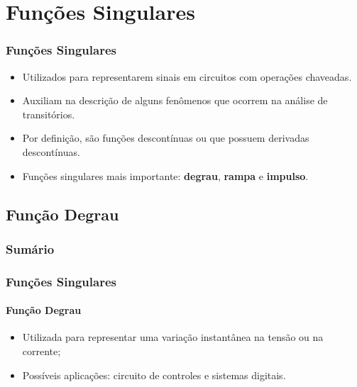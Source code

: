 \documentclass[mathserif]{beamer}
\begin{document}
\section{Funções Singulares}
\begin{frame}
\frametitle{Funções Singulares}
\begin{itemize}
	\item Utilizados para representarem sinais em circuitos com operações chaveadas.
	\item Auxiliam na descrição de alguns fenômenos que ocorrem na análise de transitórios.
	\item Por definição, são funções descontínuas ou que possuem derivadas descontínuas.
	\item Funções singulares mais importante: \textbf{degrau}, \textbf{rampa} e \textbf{impulso}. 
\end{itemize}
\end{frame}

	
\subsection{Função Degrau}
\begin{frame}
	\frametitle{Sumário}
	\small
	\tableofcontents[currentsubsection]
\end{frame}
\begin{frame}
\frametitle{Funções Singulares}
\framesubtitle{Função Degrau}
	\begin{itemize}
		\item Utilizada para representar uma variação instantânea na tensão ou na corrente;
		\vfill
		\item Possíveis aplicações: circuito de controles e sistemas digitais.
	\end{itemize}
	
\end{frame}
\end{document}
